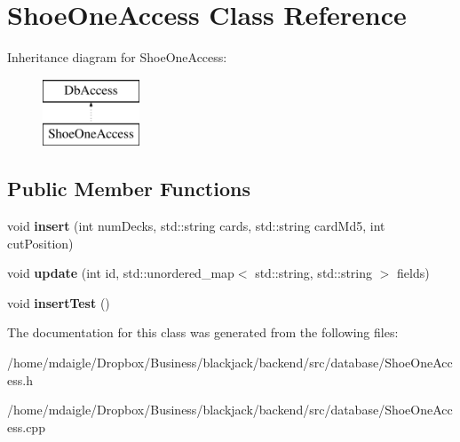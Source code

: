\hypertarget{classShoeOneAccess}{
\section{\-Shoe\-One\-Access \-Class \-Reference}
\label{classShoeOneAccess}
}
\-Inheritance diagram for \-Shoe\-One\-Access\-:\begin{figure}[H]
\begin{center}
\leavevmode
\includegraphics[height=2.000000cm]{classShoeOneAccess}
\end{center}
\end{figure}
\subsection*{\-Public \-Member \-Functions}
\begin{DoxyCompactItemize}
\item 
\hypertarget{classShoeOneAccess_a8454b1ca028aad04c17d5d329b42ec8e}{
void {\bfseries insert} (int num\-Decks, std\-::string cards, std\-::string card\-Md5, int cut\-Position)}
\label{classShoeOneAccess_a8454b1ca028aad04c17d5d329b42ec8e}

\item 
\hypertarget{classShoeOneAccess_a26c0d9be2f868e8f5854f7c1fd3814a0}{
void {\bfseries update} (int id, std\-::unordered\-\_\-map$<$ std\-::string, std\-::string $>$ fields)}
\label{classShoeOneAccess_a26c0d9be2f868e8f5854f7c1fd3814a0}

\item 
\hypertarget{classShoeOneAccess_ae1e2165c39ba782041b39a4b665d76c5}{
void {\bfseries insert\-Test} ()}
\label{classShoeOneAccess_ae1e2165c39ba782041b39a4b665d76c5}

\end{DoxyCompactItemize}


\-The documentation for this class was generated from the following files\-:\begin{DoxyCompactItemize}
\item 
/home/mdaigle/\-Dropbox/\-Business/blackjack/backend/src/database/\-Shoe\-One\-Access.\-h\item 
/home/mdaigle/\-Dropbox/\-Business/blackjack/backend/src/database/\-Shoe\-One\-Access.\-cpp\end{DoxyCompactItemize}
